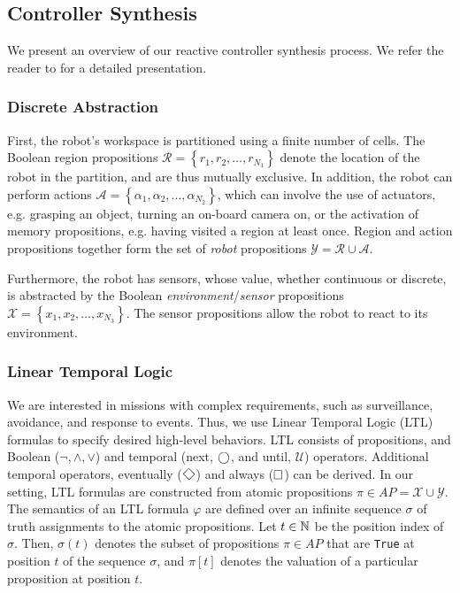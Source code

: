 \subsection{Controller Synthesis}\label{preliminariesA}

We present an overview of our reactive controller synthesis process. We refer the reader to \cite{KGFP_TRO09} for a detailed presentation.

\subsubsection*{Discrete Abstraction}

First, the robot's workspace is partitioned using a finite number of cells. The Boolean region propositions $\mathcal{R} = \left\{r_1, r_2, \ldots, r_{N_1} \right\}$ denote the location of the robot in the partition, and are thus mutually exclusive. In addition, the robot can perform actions $\mathcal{A} = \left\{\alpha_1, \alpha_2, \ldots, \alpha_{N_2} \right\}$, which can involve the use of actuators, e.g. grasping an object, turning an on-board camera on, or the activation of memory propositions, e.g. having visited a region at least once. Region and action propositions together form the set of \emph{robot} propositions $\mathcal{Y} = \mathcal{R} \cup \mathcal{A}$.

Furthermore, the robot has sensors, whose value, whether continuous or discrete, is abstracted by the Boolean \emph{environment}/\emph{sensor} propositions $\mathcal{X} = \left\{ x_1, x_2, \ldots, x_{N_3} \right\}$. 
The sensor propositions allow the robot to react to its environment. 

\subsubsection*{Linear Temporal Logic}

We are interested in missions with complex requirements, such as surveillance, avoidance, and response to events. 
Thus, we use Linear Temporal Logic (LTL) formulas to specify desired high-level behaviors. LTL consists of propositions, and Boolean ($\neg, \wedge, \lor$) and temporal (next, $\operatorname{\bigcirc}$, and until, $\mathcal{U}$) operators. 
Additional temporal operators, eventually ($\F$) and always ($\operatorname{\Box}$) can be derived. 
In our setting, LTL formulas are constructed from atomic propositions $\pi \in AP = \mathcal{X} \cup \mathcal{Y}$. 
The semantics of an LTL formula $\varphi$ are defined over an infinite sequence $\sigma$ of truth assignments to the atomic propositions. 
Let $t \in \mathbb{N}$ be the position index of $\sigma$. Then, $\sigma (t)$ denotes the subset of propositions $\pi \in AP$ that are \texttt{True} at position $t$ of the sequence $\sigma$, and $\pi [t]$ denotes the valuation of a particular proposition at position $t$.


